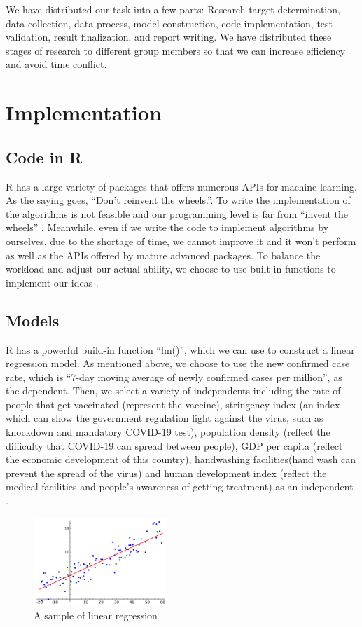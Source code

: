 \documentclass{article}
\begin{document}
\begin{multicols}{2}
We have distributed our task into a few parts: Research target determination, data collection, data process, model construction, code implementation, test validation, result finalization, and report writing. We have distributed these stages of research to different group members so that we can increase efficiency and avoid time conflict.  

\section{Implementation}
\subsection{Code in R}
R has a large variety of packages that offers numerous APIs for machine learning. As the saying goes, “Don’t reinvent the wheels.”. To write the implementation of the algorithms is not feasible and our programming level is far from “invent the wheels” \cite{ihaka1996r,zeileis2001strucchange}. Meanwhile, even if we write the code to implement algorithms by ourselves, due to the shortage of time, we cannot improve it and it won’t perform as well as the APIs offered by mature advanced packages. \cite{boehmke2019hands}To balance the workload and adjust our actual ability, we choose to use built-in functions to implement our ideas \cite{crawley2012r,team2013r,lantz2013machine}.

\subsection{Models}
R has a powerful build-in function “lm()”, which we can use to construct a linear regression model. As mentioned above, we choose to use the new confirmed case rate, which is “7-day moving average of newly confirmed cases per million”, as the dependent. Then, we select a variety of independents including the rate of people that get vaccinated (represent the vaccine), stringency index (an index which can show the government regulation fight against the virus, such as knockdown and mandatory COVID-19 test), population density (reflect the difficulty that COVID-19 can spread between people), GDP per capita (reflect the economic development of this country), handwashing facilities(hand wash can prevent the spread of the virus) and human development index (reflect the medical facilities and people’s awareness of getting treatment) as an independent \cite{rath2020prediction}. 

\begin{figure}[H]
    \centering
    \includegraphics[width=0.45\textwidth]{samplelinearregression.png}
    \caption{A sample of linear regression}
\end{figure}


\end{multicols}
\end{document}
